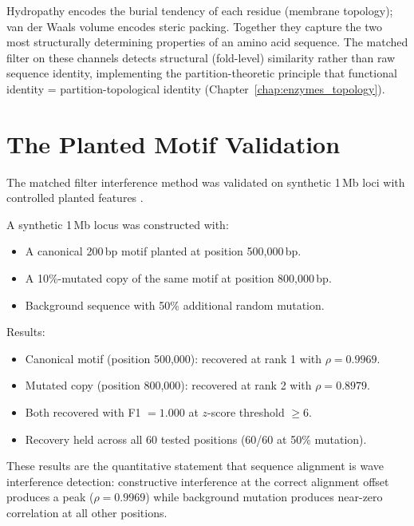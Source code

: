 \begin{remark}
Hydropathy encodes the burial tendency of each residue (membrane topology);
van der Waals volume encodes steric packing. Together they capture the two
most structurally determining properties of an amino acid sequence. The
matched filter on these channels detects structural (fold-level) similarity
rather than raw sequence identity, implementing the partition-theoretic principle
that functional identity = partition-topological identity
(Chapter~\ref{chap:enzymes_topology}).
\end{remark}

\section{The Planted Motif Validation}
\label{sec:planted_motif}

The matched filter interference method was validated on synthetic 1\,Mb loci
with controlled planted features \citep{Sachikonye2025_Interference}.

\begin{keyresult}
A synthetic 1\,Mb locus was constructed with:
\begin{itemize}
  \item A canonical 200\,bp motif planted at position 500,000\,bp.
  \item A 10\%-mutated copy of the same motif at position 800,000\,bp.
  \item Background sequence with 50\% additional random mutation.
\end{itemize}
Results:
\begin{itemize}
  \item Canonical motif (position 500,000): recovered at rank 1 with $\rho = 0.9969$.
  \item Mutated copy (position 800,000): recovered at rank 2 with $\rho = 0.8979$.
  \item Both recovered with F1 $= 1.000$ at $z$-score threshold $\geq 6$.
  \item Recovery held across all 60 tested positions (60/60 at 50\% mutation).
\end{itemize}
\end{keyresult}

These results are the quantitative statement that sequence alignment is wave
interference detection: constructive interference at the correct alignment
offset produces a peak ($\rho = 0.9969$) while background mutation produces
near-zero correlation at all other positions.

